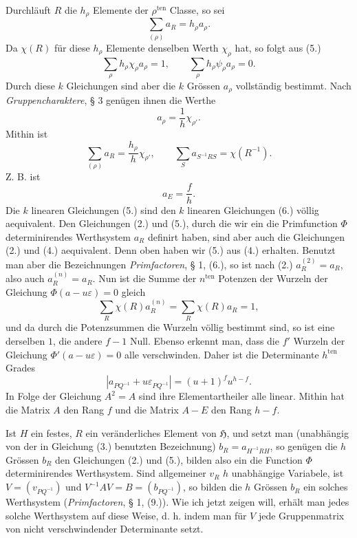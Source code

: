 \documentclass[11pt]{article}
\newcommand{\Hgr}{\mathfrak{H}}
\newcommand{\eps}{\varepsilon}
\newcommand{\ten}{\mathrm{ten}}
\begin{document}
Durchläuft $R$ die $h_\rho$ Elemente der $\rho^{\ten}$ Classe, so sei
\[
\sum_{(\rho)} a_R=h_\rho a_\rho.
\]
Da $\chi(R)$ für diese $h_\rho$ Elemente denselben Werth $\chi_\rho$ hat, so folgt aus (5.)
\[
\sum_\rho h_\rho\chi_\rho a_\rho=1,
\qquad
\sum_\rho h_\rho\psi_\rho a_\rho=0.
\]
Durch diese $k$ Gleichungen sind aber die $k$ Grössen $a_\rho$ vollständig bestimmt. Nach \emph{Gruppencharaktere}, § 3 genügen ihnen die Werthe
\[
a_\rho=\frac1h\chi_{\rho'}.
\]
Mithin ist
\begin{equation}\tag{6.}
\sum_{(\rho)}a_R=\frac{h_\rho}{h}\chi_{\rho'},
\qquad
\sum_S a_{S^{-1}RS}=\chi(R^{-1}).
\end{equation}
Z. B. ist
\begin{equation}\tag{7.}
a_E=\frac{f}{h}.
\end{equation}
Die $k$ linearen Gleichungen (5.) sind den $k$ linearen Gleichungen (6.) völlig aequivalent. Den Gleichungen (2.) und (5.), durch die wir ein die Primfunction $\Phi$ determinirendes Werthsystem $a_R$ definirt haben, sind aber auch die Gleichungen (2.) und (4.) aequivalent. Denn oben haben wir (5.) aus (4.) erhalten. Benutzt man aber die Bezeichnungen \emph{Primfactoren}, § 1, (6.), so ist nach (2.) $a_R^{(2)}=a_R$, also auch $a_R^{(n)}=a_R$. Nun ist die Summe der $n^{\ten}$ Potenzen der Wurzeln der Gleichung $\Phi(a-u\eps)=0$ gleich
\[
\sum_R\chi(R)a_R^{(n)}=\sum_R\chi(R)a_R=1,
\]
und da durch die Potenzsummen die Wurzeln völlig bestimmt sind, so ist eine derselben $1$, die andere $f-1$ Null. Ebenso erkennt man, dass die $f'$ Wurzeln der Gleichung $\Phi'(a-u\eps)=0$ alle verschwinden. Daher ist die Determinante $h^{\ten}$ Grades
\[
|a_{PQ^{-1}}+u\eps_{PQ^{-1}}|=(u+1)^f u^{h-f}.
\]
In Folge der Gleichung $A^2=A$ sind ihre Elementartheiler alle linear. Mithin hat die Matrix $A$ den Rang $f$ und die Matrix $A-E$ den Rang $h-f$.

Ist $H$ ein festes, $R$ ein veränderliches Element von $\Hgr$, und setzt man (unabhängig von der in Gleichung (3.) benutzten Bezeichnung) $b_R=a_{H^{-1}RH}$, so genügen die $h$ Grössen $b_R$ den Gleichungen (2.) und (5.), bilden also ein die Function $\Phi$ determinirendes Werthsystem. Sind allgemeiner $v_R$ $h$ unabhängige Variabele, ist $V=(v_{PQ^{-1}})$ und $V^{-1}AV=B=(b_{PQ^{-1}})$, so bilden die $h$ Grössen $b_R$ ein solches Werthsystem (\emph{Primfactoren}, § 1, (9.)). Wie ich jetzt zeigen will, erhält man jedes solche Werthsystem auf diese Weise, d. h. indem man für $V$ jede Gruppenmatrix von nicht verschwindender Determinante setzt.
\end{document}
